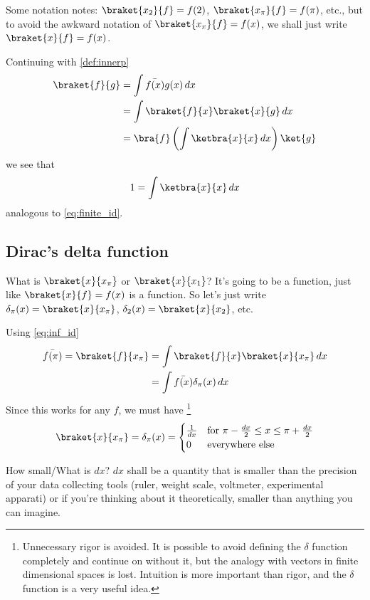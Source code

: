 \documentclass[12pt, oneside, letterpaper, fleqn]{article}
\begin{document}
Some notation notes: $\braket{x_2}{f} = f(2)$, $\braket{x_\pi}{f} =
f(\pi)$, etc., but to avoid the awkward notation of $\braket{x_x}{f} =
f(x)$, we shall just write $\braket{x}{f} = f(x)$.

Continuing with \autoref{def:innerp}
\begin{align*}
\braket{f}{g} &= \int \bar{f(x)}g(x)\,dx\\
&= \int \braket{f}{x}\braket{x}{g}\,dx\\
&= \bra{f} \left(\int \ketbra{x}{x}\,dx\right) \ket{g}
\end{align*}
we see that
\begin{align}\label{eq:inf_id}
1 = \int \ketbra{x}{x}\,dx
\end{align}
analogous to \autoref{eq:finite_id}.

\subsection{Dirac's delta function}
What is $\braket{x}{x_\pi}$ or $\braket{x}{x_1}$? It's going to be a
function, just like $\braket{x}{f} = f(x)$ is a function. So let's just
write $\delta_\pi(x) = \braket{x}{x_\pi}$, $\delta_2(x) =
\braket{x}{x_2}$, etc.

Using \autoref{eq:inf_id}
\begin{align*}
\bar{f(\pi)} = \braket{f}{x_\pi} &= \int
\braket{f}{x}\braket{x}{x_\pi}\,dx\\
&= \int \bar{f(x)} \delta_\pi(x)\,dx
\end{align*}
Since this works for any $f$, we must have
\footnote{Unnecessary rigor is avoided. It is possible to avoid
defining the $\delta$ function completely and continue on without it,
but the analogy with vectors in finite dimensional spaces is lost.
Intuition is more important than rigor, and the $\delta$ function is
a very useful idea.}
\begin{align*}
\braket{x}{x_\pi} = \delta_\pi(x) = \begin{cases}
\frac{1}{dx} & \text{for } \pi-\frac{dx}{2} \leq x \leq
\pi+\frac{dx}{2}\\
0 & \text{everywhere else}
\end{cases}
\end{align*}

How small/What is $dx$? $dx$ shall be a quantity that is smaller than the
precision of your data collecting tools (ruler, weight scale,
voltmeter, experimental apparati) or if you're thinking about it
theoretically, smaller than anything you can imagine.
\end{document}
